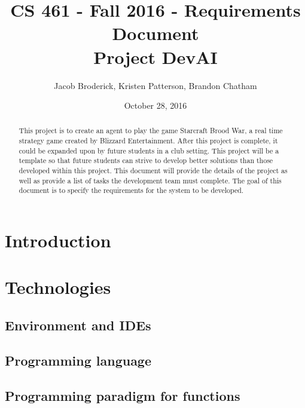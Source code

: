 \documentclass[10pt,letterpaper,onecolumn,draftclsnofoot]{IEEEtran}
\begin{document}
\begin{titlepage}

  \title{CS 461 - Fall 2016 - Requirements Document \\ Project DevAI}
  \author{Jacob Broderick, Kristen Patterson, Brandon Chatham}
  \date{October 28, 2016}
  \maketitle
  \vspace{4cm}
  \begin{abstract}
  	\noindent 
  	  	\noindent
	This project is to create an agent to play the game Starcraft Brood War, a real time strategy game created by Blizzard Entertainment. After this project is complete, it could be expanded upon by future students in a club setting. This project will be a template so that future students can strive to develop better solutions than those developed within this project. This document will provide the details of the project as well as provide a list of tasks the development team must complete. The goal of this document is to specify the requirements for the system to be developed.
   \end{abstract}
\end{titlepage}

\tableofcontents

\newpage

\section{Introduction}

\section{Technologies}

\subsection{Environment and IDEs}

\subsection{Programming language}

\subsection{Programming paradigm for functions}
\end{document}
